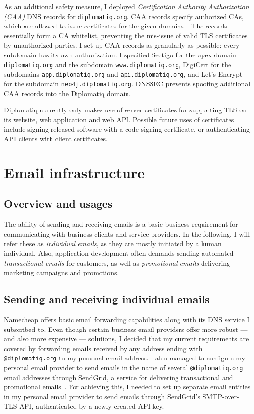 As an additional safety measure, I deployed \emph{Certification Authority Authorization (CAA)} DNS records for \lstinline{diplomatiq.org}. CAA records specify authorized CAs, which are allowed to issue certificates for the given domains~\cite{rfc8659}. The records essentially form a CA whitelist, preventing the mis-issue of valid TLS certificates by unauthorized parties. I set up CAA records as granularly as possible: every subdomain has its own authorization. I specified Sectigo for the apex domain \lstinline{diplomatiq.org} and the subdomain \lstinline{www.diplomatiq.org}, DigiCert for the subdomains \lstinline{app.diplomatiq.org} and \lstinline{api.diplomatiq.org}, and Let's Encrypt for the subdomain \lstinline{neo4j.diplomatiq.org}. DNSSEC prevents spoofing additional CAA records into the Diplomatiq domain.

Diplomatiq currently only makes use of server certificates for supporting TLS on its website, web application and web API. Possible future uses of certificates include signing released software with a code signing certificate, or authenticating API clients with client certificates.

\section{Email infrastructure}

\subsection{Overview and usages}

The ability of sending and receiving emails is a basic business requirement for communicating with business clients and service providers. In the following, I will refer these as \emph{individual emails}, as they are mostly initiated by a human individual. Also, application development often demands sending automated \emph{transactional emails} for customers, as well as \emph{promotional emails} delivering marketing campaigns and promotions.

\subsection{Sending and receiving individual emails}

Namecheap offers basic email forwarding capabilities along with its DNS service I subscribed to. Even though certain business email providers offer more robust — and also more expensive — solutions, I decided that my current requirements are covered by forwarding emails received by any address ending with \lstinline{@diplomatiq.org} to my personal email address. I also managed to configure my personal email provider to send emails in the name of several \lstinline{@diplomatiq.org} email addresses through SendGrid, a service for delivering transactional and promotional emails~\cite{sendgrid-website}. For achieving this, I needed to set up separate email entities in my personal email provider to send emails through SendGrid's SMTP-over-TLS API, authenticated by a newly created API key.

